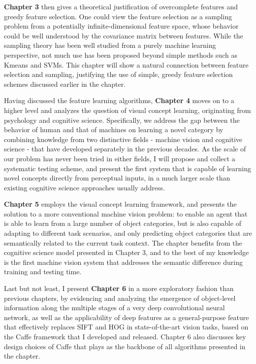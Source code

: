 {\bfseries Chapter 3} then gives a theoretical justification of overcomplete features and greedy feature selection. One could view the feature selection as a sampling problem from a potentially infinite-dimensional feature space, whose behavior could be well understood by the covariance matrix between features. While the \nystrom sampling theory has been well studied from a purely machine learning perspective, not much use has been proposed beyond simple methods such as Kmeans and SVMs. This chapter will show a natural connection between feature selection and \nystrom sampling, justifying the use of simple, greedy feature selection schemes discussed earlier in the chapter.

Having discussed the feature learning algorithms, {\bfseries Chapter 4} moves on to a higher level and analyzes the question of visual concept learning, originating from psychology and cognitive science. Specifically, we address the gap between the behavior of human and that of machines on learning a novel category by combining knowledge from two distinctive fields - machine vision and cognitive science - that have developed separately in the previous decades. As the scale of our problem has never been tried in either fields, I will propose and collect a systematic testing scheme, and present the first system that is capable of learning novel concepts directly from perceptual inputs, in a much larger scale than existing cognitive science approaches usually address.

{\bfseries Chapter 5} employs the visual concept learning framework, and presents the solution to a more conventional machine vision problem: to enable an agent that is able to learn from a large number of object categories, but is also capable of adapting to different task scenarios, and only predicting object categories that are semantically related to the current task context. The chapter benefits from the cognitive science model presented in Chapter 3, and to the best of my knowledge is the first machine vision system that addresses the semantic difference during training and testing time.

Last but not least, I present {\bfseries Chapter 6} in a more exploratory fashion than previous chapters, by evidencing and analyzing the emergence of object-level information along the multiple stages of a very deep convolutional neural network, as well as the applicability of deep features as a general-purpose feature that effectively replaces SIFT and HOG in state-of-the-art vision tasks, based on the Caffe framework that I developed and released. Chapter 6 also discusses key design choices of Caffe that plays as the backbone of all algorithms presented in the chapter.


